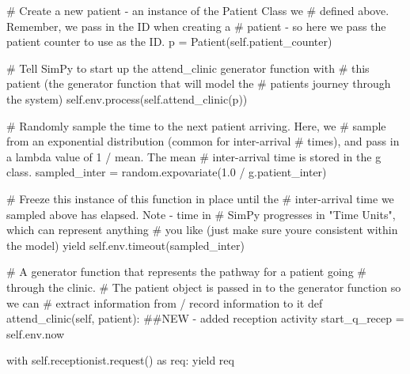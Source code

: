 \documentclass[
  letterpaper,
  DIV=11,
  numbers=noendperiod]{scrreprt}
\newenvironment{Shaded}{}{}
\newcommand{\CommentTok}[1]{\textcolor[rgb]{0.42,0.45,0.49}{#1}}
\newcommand{\ControlFlowTok}[1]{\textcolor[rgb]{0.84,0.23,0.29}{#1}}
\newcommand{\FloatTok}[1]{\textcolor[rgb]{0.00,0.36,0.77}{#1}}
\newcommand{\ImportTok}[1]{\textcolor[rgb]{0.01,0.18,0.38}{#1}}
\newcommand{\KeywordTok}[1]{\textcolor[rgb]{0.84,0.23,0.29}{#1}}
\newcommand{\NormalTok}[1]{\textcolor[rgb]{0.14,0.16,0.18}{#1}}
\newcommand{\OperatorTok}[1]{\textcolor[rgb]{0.14,0.16,0.18}{#1}}
\newcommand{\VariableTok}[1]{\textcolor[rgb]{0.89,0.38,0.04}{#1}}
\begin{document}
\begin{tcolorbox}
\begin{Shaded}
\begin{Highlighting}[]
            \CommentTok{\# Create a new patient {-} an instance of the Patient Class we}
            \CommentTok{\# defined above.  Remember, we pass in the ID when creating a}
            \CommentTok{\# patient {-} so here we pass the patient counter to use as the ID.}
\NormalTok{            p }\OperatorTok{=}\NormalTok{ Patient(}\VariableTok{self}\NormalTok{.patient\_counter)}

            \CommentTok{\# Tell SimPy to start up the attend\_clinic generator function with}
            \CommentTok{\# this patient (the generator function that will model the}
            \CommentTok{\# patient\textquotesingle{}s journey through the system)}
            \VariableTok{self}\NormalTok{.env.process(}\VariableTok{self}\NormalTok{.attend\_clinic(p))}

            \CommentTok{\# Randomly sample the time to the next patient arriving.  Here, we}
            \CommentTok{\# sample from an exponential distribution (common for inter{-}arrival}
            \CommentTok{\# times), and pass in a lambda value of 1 / mean.  The mean}
            \CommentTok{\# inter{-}arrival time is stored in the g class.}
\NormalTok{            sampled\_inter }\OperatorTok{=}\NormalTok{ random.expovariate(}\FloatTok{1.0} \OperatorTok{/}\NormalTok{ g.patient\_inter)}

            \CommentTok{\# Freeze this instance of this function in place until the}
            \CommentTok{\# inter{-}arrival time we sampled above has elapsed.  Note {-} time in}
            \CommentTok{\# SimPy progresses in "Time Units", which can represent anything}
            \CommentTok{\# you like (just make sure you\textquotesingle{}re consistent within the model)}
            \ControlFlowTok{yield} \VariableTok{self}\NormalTok{.env.timeout(sampled\_inter)}

    \CommentTok{\# A generator function that represents the pathway for a patient going}
    \CommentTok{\# through the clinic.}
    \CommentTok{\# The patient object is passed in to the generator function so we can}
    \CommentTok{\# extract information from / record information to it}
    \KeywordTok{def}\NormalTok{ attend\_clinic(}\VariableTok{self}\NormalTok{, patient):}
        \CommentTok{\#\#NEW {-} added reception activity}
\NormalTok{        start\_q\_recep }\OperatorTok{=} \VariableTok{self}\NormalTok{.env.now}

        \ControlFlowTok{with} \VariableTok{self}\NormalTok{.receptionist.request() }\ImportTok{as}\NormalTok{ req:}
            \ControlFlowTok{yield}\NormalTok{ req}


\end{Highlighting}
\end{Shaded}
\end{tcolorbox}
\end{document}
